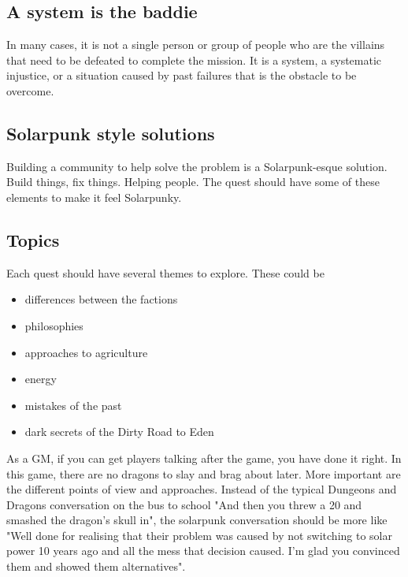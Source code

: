 \subsection{A system is the baddie}

In many cases, it is not a single person or group of people who are the villains that need to be defeated to complete the mission. It is a system, a systematic injustice, or a situation caused by past failures that is the obstacle to be overcome.

\subsection{Solarpunk style solutions}

Building a community to help solve the problem is a Solarpunk-esque solution. Build things, fix things. Helping people. The quest should have some of these elements to make it feel Solarpunky.

\subsection{Topics}

Each quest should have several themes to explore. These could be
\begin{itemize}
    \item differences between the factions
    \item philosophies
    \item approaches to agriculture
    \item energy
    \item mistakes of the past
    \item dark secrets of the Dirty Road to Eden
\end{itemize}

As a GM, if you can get players talking after the game, you have done it right. In this game, there are no dragons to slay and brag about later. More important are the different points of view and approaches. Instead of the typical Dungeons and Dragons conversation on the bus to school "And then you threw a 20 and smashed the dragon's skull in", the solarpunk conversation should be more like "Well done for realising that their problem was caused by not switching to solar power 10 years ago and all the mess that decision caused. I'm glad you convinced them and showed them alternatives".